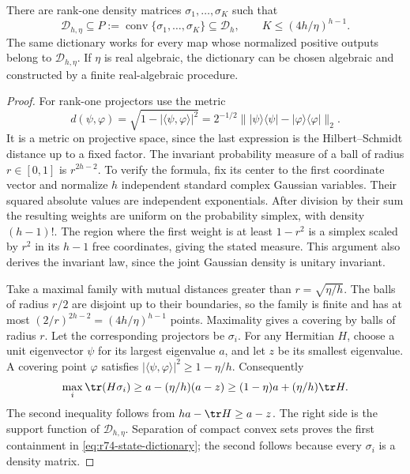 \begin{lemma}\label{lem:r74-state-dictionary}
There are rank-one density matrices $\sigma_1,\ldots,\sigma_K$ such that
\begin{equation}\label{eq:r74-state-dictionary}
 \mathcal D_{h,\eta}\subseteq
 P:=\operatorname{conv}\{\sigma_1,\ldots,\sigma_K\}
 \subseteq\mathcal D_h,
 \qquad K\le(4h/\eta)^{h-1}.
\end{equation}
The same dictionary works for every map whose normalized positive outputs
belong to $\mathcal D_{h,\eta}$. If $\eta$ is real algebraic, the dictionary
can be chosen algebraic and constructed by a finite real-algebraic procedure.
\end{lemma}
\begin{proof}
For rank-one projectors use the metric
\[
 d(\psi,\varphi)=\sqrt{1-|\langle\psi,\varphi\rangle|^2}
   =2^{-1/2}\bigl\||\psi\rangle\langle\psi|
                   -|\varphi\rangle\langle\varphi|\bigr\|_2.
\]
It is a metric on projective space, since the last expression is the
Hilbert--Schmidt distance up to a fixed factor. The invariant probability
measure of a ball of radius $r\in[0,1]$ is $r^{2h-2}$. To verify the formula,
fix its center to the first coordinate vector and normalize $h$ independent
standard complex Gaussian variables. Their squared absolute values are
independent exponentials. After division by their sum the resulting weights
are uniform on the probability simplex, with density $(h-1)!$. The region
where the first weight is at least $1-r^2$ is a simplex scaled by $r^2$
in its $h-1$ free coordinates, giving the stated measure. This argument also
derives the invariant law, since the joint Gaussian density is unitary
invariant.

Take a maximal family with mutual distances greater than
$r=\sqrt{\eta/h}$. The balls of radius $r/2$ are disjoint up to their
boundaries, so the family is finite and has at most
$(2/r)^{2h-2}=(4h/\eta)^{h-1}$ points. Maximality gives a covering by
balls of radius $r$. Let the corresponding projectors be $\sigma_i$.
For any Hermitian $H$, choose a unit eigenvector $\psi$ for its largest
eigenvalue $a$, and let $z$ be its smallest eigenvalue. A covering point
$\varphi$ satisfies $|\langle\psi,\varphi\rangle|^2\ge1-\eta/h$.
Consequently
\[
 \max_i\tr(H\sigma_i)\ge a-(\eta/h)(a-z)
 \ge(1-\eta)a+(\eta/h)\tr H.
\]
The second inequality follows from $ha-\tr H\ge a-z$.
The right side is the support function of $\mathcal D_{h,\eta}$.
Separation of compact convex sets proves the first containment in
\eqref{eq:r74-state-dictionary}; the second follows because every
$\sigma_i$ is a density matrix.


\end{proof}
